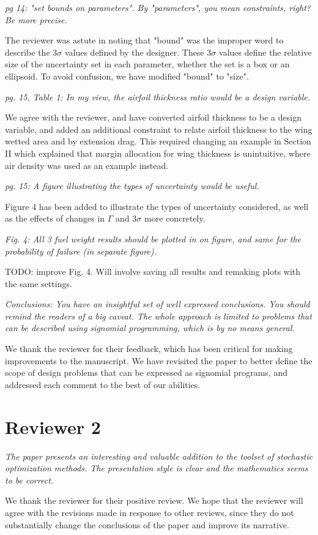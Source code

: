 \documentclass[11pt]{article}
\begin{document}
\textit{pg 14: "set bounds on parameters". By "parameters", you mean constraints, right? Be more precise.}

The reviewer was astute in noting that "bound" was the improper word to describe the $3\sigma$ values
defined by the designer. These $3\sigma$ values define the relative size
of the uncertainty set in each parameter, whether the set is a box or an ellipsoid.
To avoid confusion, we have modified "bound" to "size". 

\textit{pg. 15, Table 1: In my view, the airfoil thickness ratio would be a design variable.}

We agree with the reviewer, and have converted airfoil thickness to be a design variable, 
and added an additional constraint to relate airfoil thickness to the wing wetted area and by extension drag. 
This required changing an example in Section II which explained that margin allocation for wing thickness 
is unintuitive, where air density was used as an example instead. 

\textit{pg. 15: A figure illustrating the types of uncertainty would be useful.}

Figure 4 has been added to illustrate the types of uncertainty considered, 
as well as the effects of changes in $\Gamma$ and $3\sigma$ more concretely. 

\textit{Fig. 4: All 3 fuel weight results should be plotted in on figure, and same for the probability of failure (in separate figure).}

TODO: improve Fig. 4. Will involve saving all results and remaking plots with the same settings. 

\textit{Conclusions: You have an insightful set of well expressed conclusions. You should remind the readers of a big caveat. The whole approach is limited to problems that can be described using signomial programming, which is by no means general.}

We thank the reviewer for their feedback, which has been critical for making improvements to the manuscript. We 
have revisited the paper to better define the scope of design problems that can be expressed as signomial 
programs, and addressed each comment to the best of our abilities. 

\section{Reviewer 2}

\textit{The paper presents an interesting and valuable addition to the toolset of stochastic optimization methods. 
The presentation style is clear and the mathematics seems to be correct.}

We thank the reviewer for their positive review. We hope that the reviewer
will agree with the revisions made in response to other reviews, since
they do not substantially change the conclusions of the paper
and improve its narrative. 
\end{document}
